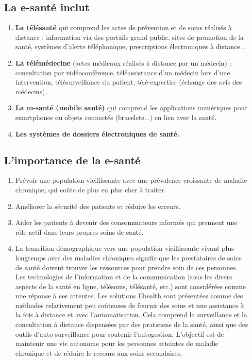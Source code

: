 \documentclass[12pt]{article}
\begin{document}
\subsection{La e-santé inclut}
\begin{enumerate}
	\item \textbf{La télésanté} qui comprend les actes de prévention et de soins réalisés à distance : information via des portails grand public, sites de promotion de la santé, systèmes d'alerte téléphonique, prescriptions électroniques à distance...
	\item \textbf{La télémédecine} (actes médicaux réalisés à distance par un médecin) : consultation par vidéoconférence, téléassistance d'un médecin lors d'une intervention, télésurveillance du patient, télé-expertise (échange des avis des médecins)...
	\item \textbf{La m-santé (mobile santé)} qui comprend les applications numériques pour smartphones ou objets connectés (bracelets...) en lien avec la santé.
	\item \textbf{Les systèmes de dossiers électroniques de santé.}
\end{enumerate}

\subsection{L’importance de la e-santé}
\begin{enumerate}
	\item Prévoir une population vieillissante avec une prévalence croissante de maladie chronique, qui coûte de plus en plus cher à traiter.
	\item Améliorer la sécurité des patients et réduire les erreurs.
	\item Aider les patients à devenir des consommateurs informés qui prennent une rôle actif dans leurs propres soins de santé.
	\item La transition démographique vers une population vieillissante vivant plus longtemps avec des maladies chroniques signifie que les prestataires de soins de santé doivent trouver les ressources pour prendre soin de ces personnes. Les technologies de l’information et de la communication (sous les divers aspects de la santé en ligne, télésoins, télésanté, etc.) sont considérées comme une réponse à ces attentes. Les solutions Ehealth sont présentées comme des méthodes relativement peu coûteuses de fournir des soins et une assistance à la fois à distance et avec l’automatisation. Cela comprend la surveillance et la consultation à distance dispensées par des praticiens de la santé, ainsi que des outils d'auto-surveillance pour soutenir l'autogestion. L’objectif est de maintenir une vie autonome pour les personnes atteintes de maladie chronique et de réduire le recours aux soins secondaires.
\end{enumerate}
\end{document}
